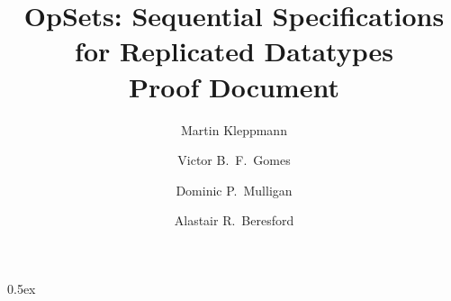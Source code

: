\documentclass[11pt,a4paper]{article}
\begin{document}
\title{OpSets: Sequential Specifications for Replicated Datatypes\\Proof Document}
\author[1]{Martin Kleppmann}
\author[1]{Victor B.\ F.\ Gomes}
\author[2]{Dominic P.\ Mulligan}
\author[1]{Alastair R.\ Beresford}
\date{}
\maketitle

\tableofcontents

\parindent 0pt\parskip 0.5ex



%
%
\end{document}
